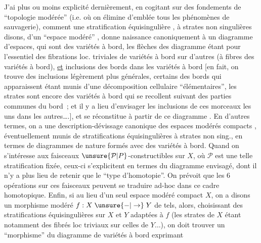 J'ai plus ou moins explicité dernièrement, en cogitant sur des fondements de ``topologie modérée'' (i.e. où on élimine d'emblée tous les phénomènes de sauvagerie), comment une stratification équisingulière%
, à strates non singulières disons, d'un ``espace modéré'' , donne naissance canoniquement à un diagramme  d'espaces,
%
qui sont des variétés à bord, les  flèches des
diagramme étant pour l'essentiel des fibrations
loc. triviales de variétés à bord sur d'autres
(à fibres des variétés à bord), \uline{et}  inclusions
des bords dans les variétés à bord \deleted{(}[en
fait, on trouve des inclusions légèrement
plus générales, certains des bords qui apparaissent
étant munis d'une décomposition
cellulaire ``élémentaires'',  les
strates  sont encore des variétés à bord qui se
recollent suivant des parties communes du
bord~; et il y a lieu d'envisager  les inclusions
de ces morceaux les uns dans les
autres\ldots.\deleted{)}], et se réconstitue à partir de
ce diagramme . En d'autres termes, on
a une description-dévissage canonique
des espaces modérés compacts , éventuellement
munis de stratifications équisingulières
à strates non sing., en termes de diagrammes
 de nature  formés avec des variétés
à bord. Quand on s'intéresse aux faisceaux
$\unsure{\mathcal{P}|P}$-constructibles sur $X$, où $\mathcal{P}$ est une telle
stratification fixée, ceux-ci s'explicitent en
termes du diagramme envisagé, dont il
%
n'y a plus lieu de retenir que le ``type d'homotopie''. On prévoit que les 6 opérations sur ces faisceaux peuvent se traduire ad-hoc dans ce cadre homotopique. Enfin, si au lieu d'un seul espace modéré compact $X$, on a disons un morphisme modéré $f:X\mathrel{\unsure{-|\to}}Y$ de tels, alors, choisissant des stratifications équisingulières sur $X$ et $Y$ adaptées à $f$ (les strates de $X$ étant notamment des fibrés loc triviaux sur celles de $Y\ldots$), on doit trouver un ``morphisme'' du diagramme de variétés à bord exprimant
